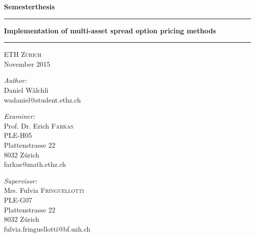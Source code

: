 \documentclass[a4paper]{article}
\begin{document}
\begin{titlepage}
\begin{center}

\large \textbf{Semesterthesis}

\vspace{1cm}
\hrule
\vspace{0.4cm}
\huge \textbf{Implementation of multi-asset spread option pricing methods}\\
\vspace{0.4cm}
\hrule
\vspace{0.4cm}
\textsc{\large ETH Z\"urich}\\
\vspace{0.4cm}
\large {November 2015}

\vspace{6cm}




\vspace{4cm}
\large \emph{Author:}\\
\large Daniel W\"alchli\\
\large wadaniel@student.ethz.ch\\
\vspace{1cm}
\noindent
\begin{minipage}{0.4\textwidth}
\begin{flushleft} \normalsize
\emph{Examiner:}\\
Prof. Dr. Erich \textsc{Farkas}\\
PLE-H05\\
Plattenstrasse 22\\
8032 Z\"urich\\
farkas@math.ethz.ch
\end{flushleft}
\end{minipage}%
\begin{minipage}{0.4\textwidth}
\begin{flushright} \normalsize
\emph{Supervisor:} \\
Mrs. Fulvia \textsc{Fringuellotti}\\
PLE-G07\\
Plattenstrasse 22\\
8032 Z\"urich\\
fulvia.fringuellotti@bf.uzh.ch
\end{flushright}
\end{minipage}

\end{center}
\end{titlepage}

\setcounter{page}{1}
\end{document}
